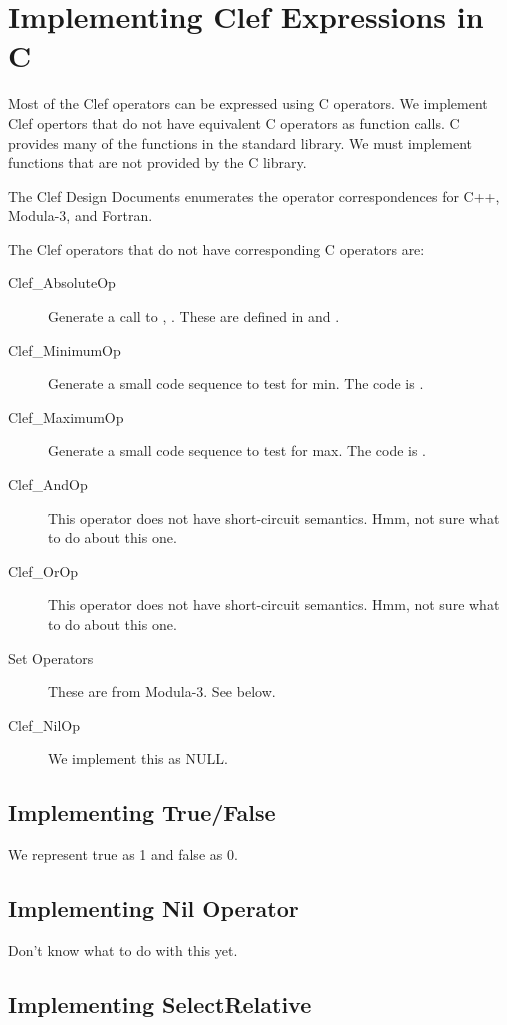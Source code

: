 
\section{Implementing Clef Expressions in C}

Most of the Clef operators can be expressed using C operators.  We
implement Clef opertors that do not have equivalent C operators as
function calls.  C provides many of the functions in the standard
library.  We must implement functions that are not provided by the C
library.

The Clef Design Documents enumerates the operator correspondences
for C++, Modula-3, and Fortran\cite{clefdd}.

The Clef operators that do not have corresponding C operators 
are:

\begin{description}
\item[Clef\_AbsoluteOp] Generate a call to , .
These are defined in  and
.
\item[Clef\_MinimumOp] Generate a small code sequence to test
for min. The code is .
\item[Clef\_MaximumOp] Generate a small code sequence to test 
for max.  The code is .
\item[Clef\_AndOp] This operator does not have short-circuit semantics.
Hmm, not sure what to do about this one.
\item[Clef\_OrOp] This operator does not have short-circuit semantics.
Hmm, not sure what to do about this one.
\item[Set Operators] These are from Modula-3.  See below.
\item[Clef\_NilOp] We implement this as NULL.
\end{description}

\subsection{Implementing True/False}

We represent true as 1 and false as 0.

\subsection{Implementing Nil Operator}

Don't know what to do with this yet.

\subsection{Implementing SelectRelative}

